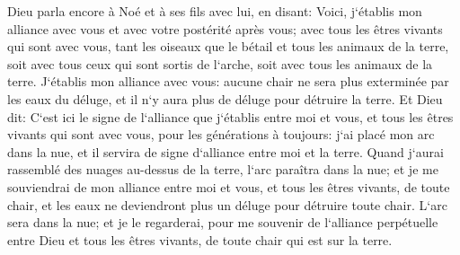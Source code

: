 \verse Dieu parla encore à Noé et à ses fils avec lui, en disant: 
\verse Voici, j`établis mon alliance avec vous et avec votre postérité après vous; 
\verse avec tous les êtres vivants qui sont avec vous, tant les oiseaux que le bétail et tous les animaux de la terre, soit avec tous ceux qui sont sortis de l`arche, soit avec tous les animaux de la terre. 
\verse J`établis mon alliance avec vous: aucune chair ne sera plus exterminée par les eaux du déluge, et il n`y aura plus de déluge pour détruire la terre. 
\verse Et Dieu dit: C`est ici le signe de l`alliance que j`établis entre moi et vous, et tous les êtres vivants qui sont avec vous, pour les générations à toujours: 
\verse j`ai placé mon arc dans la nue, et il servira de signe d`alliance entre moi et la terre. 
\verse Quand j`aurai rassemblé des nuages au-dessus de la terre, l`arc paraîtra dans la nue; 
\verse et je me souviendrai de mon alliance entre moi et vous, et tous les êtres vivants, de toute chair, et les eaux ne deviendront plus un déluge pour détruire toute chair. 
\verse L`arc sera dans la nue; et je le regarderai, pour me souvenir de l`alliance perpétuelle entre Dieu et tous les êtres vivants, de toute chair qui est sur la terre. 
